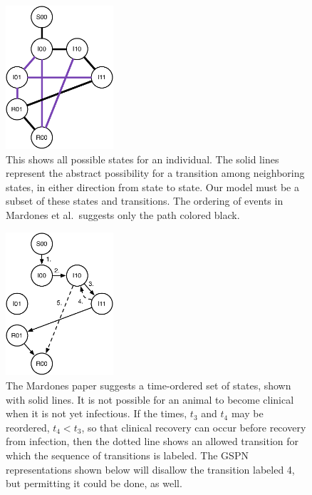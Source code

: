 \documentclass{article}
\begin{document}
\begin{figure}
\centerline{\includegraphics[width=4cm]{all_states}}
\caption{This shows all possible states for an individual.
The solid lines represent the abstract possibility for a transition
among neighboring states, in either direction from state to state.
Our model must be a subset of these
states and transitions. The ordering of events in Mardones et
al.\ suggests only the path colored black.\label{fig:all_states}}
\end{figure}
\begin{figure}
\centerline{\includegraphics[width=4cm]{state_space_mardones}}
\caption{The Mardones paper suggests a time-ordered set of
states, shown with solid lines. It is not possible for an
animal to become clinical when it is not yet infectious.
If the times, $t_3$ and $t_4$ may be reordered, $t_4<t_3$,
so that clinical recovery can occur before recovery from
infection,
then the dotted line shows an allowed transition for which
the sequence of transitions is labeled.
The GSPN representations shown below will disallow the
transition labeled 4, but permitting it could be done,
as well.\label{fig:state_space_mardones}}
\end{figure}
\end{document}
